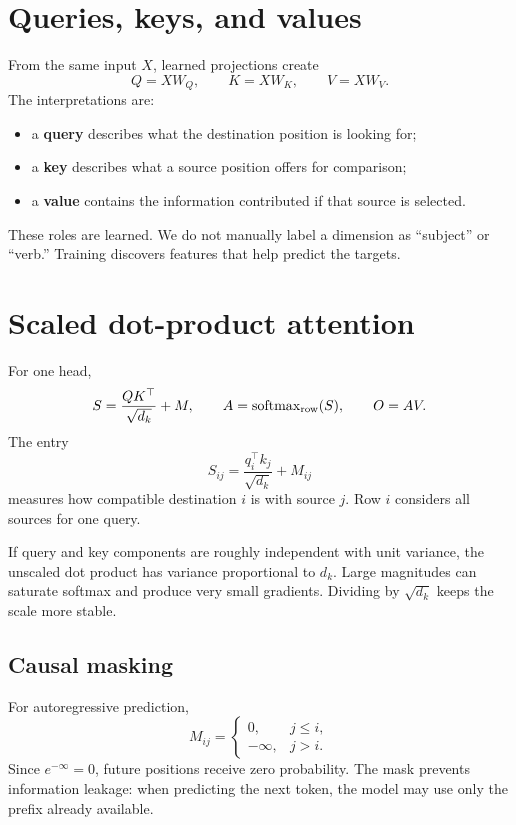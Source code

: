 \documentclass[11pt]{article}
\newcommand{\softmax}{\operatorname{softmax}}
\begin{document}
\section{Queries, keys, and values}

From the same input $X$, learned projections create
\[
  Q=XW_Q,\qquad K=XW_K,\qquad V=XW_V.
\]
The interpretations are:
\begin{itemize}
  \item a \textbf{query} describes what the destination position is looking for;
  \item a \textbf{key} describes what a source position offers for comparison;
  \item a \textbf{value} contains the information contributed if that source is selected.
\end{itemize}
These roles are learned. We do not manually label a dimension as ``subject'' or ``verb.'' Training discovers
features that help predict the targets.

\section{Scaled dot-product attention}

For one head,
\begin{equation}
  S=\frac{QK^\top}{\sqrt{d_k}}+M,\qquad
  A=\softmax_{\rm row}(S),\qquad
  O=AV.
  \label{eq:attention}
\end{equation}
The entry
\[
  S_{ij}=\frac{q_i^\top k_j}{\sqrt{d_k}}+M_{ij}
\]
measures how compatible destination $i$ is with source $j$. Row $i$ considers all sources for one query.

If query and key components are roughly independent with unit variance, the unscaled dot product has
variance proportional to $d_k$. Large magnitudes can saturate softmax and produce very small gradients.
Dividing by $\sqrt{d_k}$ keeps the scale more stable.

\subsection{Causal masking}

For autoregressive prediction,
\[
  M_{ij}=\begin{cases}
  0,&j\leq i,\\
  -\infty,&j>i.
  \end{cases}
\]
Since $e^{-\infty}=0$, future positions receive zero probability. The mask prevents information leakage:
when predicting the next token, the model may use only the prefix already available.
\end{document}
